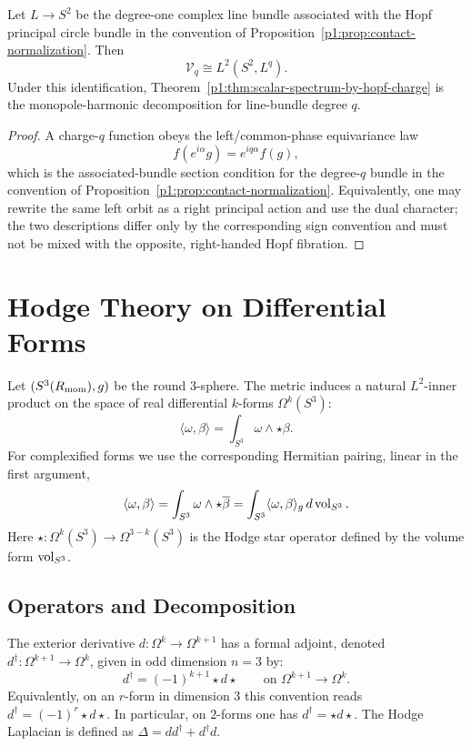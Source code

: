 \documentclass[11pt]{article}
\begin{document}
\begin{proposition}
\label{p1:prop:hopf-charge-line-bundle}
Let \(L\to S^2\) be the degree-one complex line bundle associated with the
Hopf principal circle bundle in the convention of
Proposition~\ref{p1:prop:contact-normalization}.  Then
\[
  \mathcal V_q\cong L^2(S^2,L^q).
\]
Under this identification, Theorem~\ref{p1:thm:scalar-spectrum-by-hopf-charge}
is the monopole-harmonic decomposition for line-bundle degree \(q\).
\end{proposition}

\begin{proof}
A charge-\(q\) function obeys the left/common-phase equivariance law
\[
        f(e^{i\alpha}g)=e^{iq\alpha}f(g),
\]
which is the associated-bundle section condition for the degree-\(q\) bundle
in the convention of Proposition~\ref{p1:prop:contact-normalization}.
Equivalently, one may rewrite the same left orbit as a right principal action
and use the dual character; the two descriptions differ only by the
corresponding sign convention and must not be mixed with the opposite,
right-handed Hopf fibration.
\end{proof}

\section{Hodge Theory on Differential Forms}
\label{p1:sec:hodge-theory}

Let $(S^3(R_{\mathrm{mom}}),g)$ be the round 3-sphere. The metric induces a natural $L^2$-inner product on the space of real differential $k$-forms $\Omega^k(S^3)$:
\[
\langle \omega, \beta \rangle = \int_{S^3} \omega \wedge \star \beta.
\]
For complexified forms we use the corresponding Hermitian pairing, linear in the first argument,
\[
\langle \omega, \beta \rangle = \int_{S^3} \omega \wedge \star\overline{\beta}
=\int_{S^3}\langle \omega,\beta\rangle_g\,d\operatorname{vol}_{S^3}.
\]
Here $\star: \Omega^k(S^3) \to \Omega^{3-k}(S^3)$ is the Hodge star operator defined by the volume form $\operatorname{vol}_{S^3}$.

\subsection{Operators and Decomposition}

The exterior derivative $d: \Omega^k \to \Omega^{k+1}$ has a formal adjoint, denoted $d^\dagger:\Omega^{k+1}\to\Omega^k$, given in odd dimension $n=3$ by:
\[
d^\dagger = (-1)^{k+1} \star d \star
\qquad\text{on }\Omega^{k+1}\to\Omega^k.
\]
Equivalently, on an $r$-form in dimension $3$ this convention reads
$d^\dagger=(-1)^r\star d\star$. In particular, on $2$-forms one has
$d^\dagger=\star d\star$.
The Hodge Laplacian is defined as $\Delta = d d^\dagger + d^\dagger d$.
\end{document}
